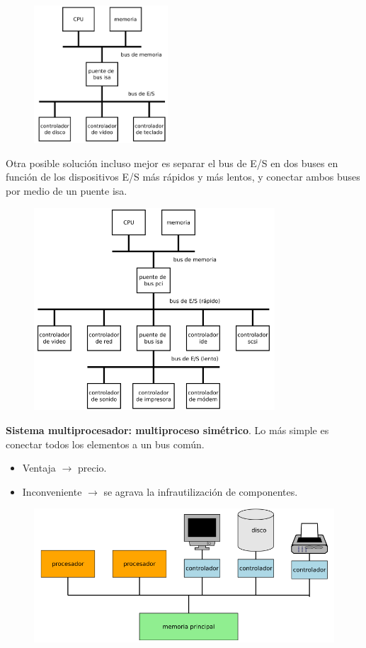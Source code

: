 \documentclass{article}
\begin{document}
\begin{figure}[h]
\centering
\includegraphics[scale=1,width=50mm]{solucionmonoprocesador.png}
\end{figure}
\newpage
Otra posible solución incluso mejor es separar el bus de E/S en dos buses en función de los dispositivos E/S más rápidos y más lentos, y conectar ambos buses por medio de un puente isa.

\begin{figure}[h]
\centering
\includegraphics[scale=1,width=90mm]{sol2monoprocesador.png}
\end{figure}

\textbf{Sistema multiprocesador: multiproceso simétrico}. Lo más simple es conectar todos los elementos a un bus común.
\begin{itemize}
\item Ventaja $\rightarrow$ precio.

\item Inconveniente $\rightarrow$ se agrava la infrautilización de componentes.
\end{itemize}

\begin{figure}[h]
\centering
\includegraphics[scale=1,width=\textwidth]{multiprocesador.png}
\end{figure}
\end{document}
